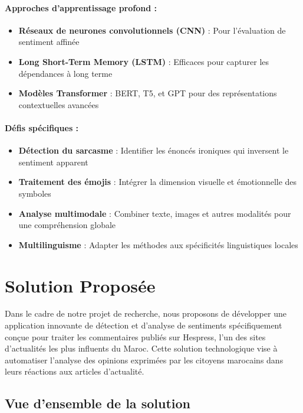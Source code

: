 \paragraph{Approches d'apprentissage profond :}
\begin{itemize}
    \item \textbf{Réseaux de neurones convolutionnels (CNN)} : Pour l'évaluation de sentiment affinée
    \item \textbf{Long Short-Term Memory (LSTM)} : Efficaces pour capturer les dépendances à long terme
    \item \textbf{Modèles Transformer} : BERT, T5, et GPT pour des représentations contextuelles avancées
\end{itemize}

\paragraph{Défis spécifiques :}
\begin{itemize}
    \item \textbf{Détection du sarcasme} : Identifier les énoncés ironiques qui inversent le sentiment apparent
    \item \textbf{Traitement des émojis} : Intégrer la dimension visuelle et émotionnelle des symboles
    \item \textbf{Analyse multimodale} : Combiner texte, images et autres modalités pour une compréhension globale
    \item \textbf{Multilinguisme} : Adapter les méthodes aux spécificités linguistiques locales
\end{itemize}

\section{Solution Proposée}

Dans le cadre de notre projet de recherche, nous proposons de développer une application innovante de détection et d'analyse de sentiments spécifiquement conçue pour traiter les commentaires publiés sur Hespress, l'un des sites d'actualités les plus influents du Maroc. Cette solution technologique vise à automatiser l'analyse des opinions exprimées par les citoyens marocains dans leurs réactions aux articles d'actualité.

\subsection{Vue d'ensemble de la solution}

